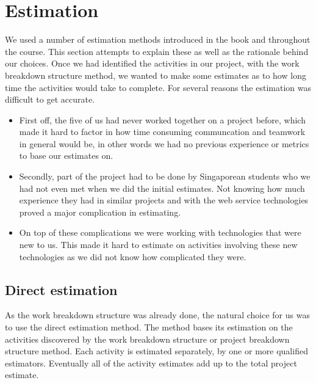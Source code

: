 \section{Estimation}
We used a number of estimation methods introduced in the book \cite{caye} and throughout the course. This section attempts to explain these as well as the rationale behind our choices.
\label{sec:EmpiriEstimation}
Once we had identified the activities in our project, with the work breakdown structure method, we wanted to make some estimates as to how long time the activities would take to complete. For several reasons the estimation was difficult to get accurate.
\begin{itemize}
\item First off, the five of us had never worked together on a project before, which made it hard to factor in how time consuming communcation and teamwork in general would be, in other words we had no previous experience or metrics to base our estimates on. 

\item Secondly, part of the project had to be done by Singaporean students who we had not even met when we did the initial estimates. Not knowing how much experience they had in similar projects and with the web service technologies proved a major complication in estimating.

\item  On top of these complications we were working with technologies that were new to us. This made it hard to estimate on activities involving these new technologies as we did not know how complicated they were.

\end{itemize}
\subsection{Direct estimation}
As the work breakdown structure was already done, the natural choice for us was to use the direct estimation method\cite{caye}. The method bases its estimation on the activities discovered by the work breakdown structure or project breakdown structure method. Each activity is  estimated separately, by one or more qualified estimators. Eventually all of the activity estimates add up to the total project estimate. 

